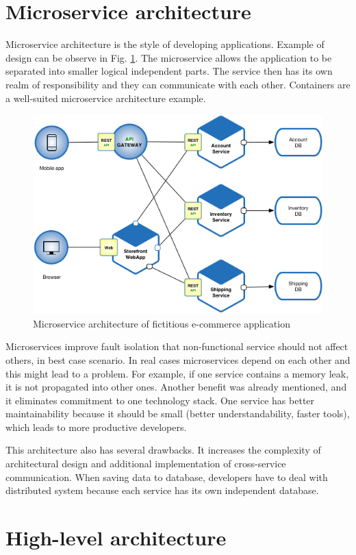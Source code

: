 \section{Microservice architecture}

Microservice architecture is the style of developing applications. Example of design can be observe in Fig. \ref{fig:microservice_architecture}. The microservice allows the application to be separated into smaller logical independent parts. The service then has its own realm of responsibility and they can communicate with each other. Containers are a well-suited microservice architecture example. \cite{WhatIsMicroservicesArchitecture}

\begin{figure}[H]
    \centering
    \includegraphics[width=.5\linewidth]{other-fig/microservice_architecture.png}        
    \caption{Microservice architecture of fictitious e-commerce application}
    \label{fig:microservice_architecture}
\end{figure}

Microservices improve fault isolation that non-functional service should not affect others, in best case scenario. In real cases microservices depend on each other and this might lead to a problem. For example, if one service contains a memory leak, it is not propagated into other ones. Another benefit was already mentioned, and it eliminates commitment to one technology stack. One service has better maintainability because it should be small (better understandability, faster tools), which leads to more productive developers. \cite{ MicroserviceArchitecture}

This architecture also has several drawbacks. It increases the complexity of architectural design and additional implementation of cross-service communication. When saving data to database, developers have to deal with distributed system because each service has its own independent database. \cite{ MicroserviceArchitecture}

\section{High-level architecture}

